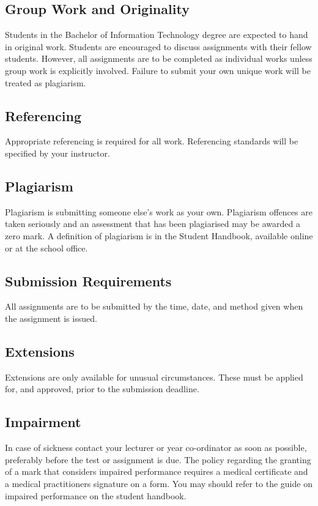 \documentclass{article}
\begin{document}
\subsection*{Group Work and Originality}
Students in the Bachelor of Information Technology degree are expected to hand in original work.  Students are encouraged to discuss
assignments with their fellow students.  However, all assignments are to be completed as individual works unless group work is explicitly involved.
Failure to submit your own unique work will be treated as plagiarism.

\subsection*{Referencing}
Appropriate referencing is required for all work.  Referencing standards will be specified by your instructor.

\subsection*{Plagiarism}
Plagiarism is submitting someone else's work as your own.  Plagiarism offences are taken seriously and an
assessment that has been plagiarised may be awarded a zero mark.  A definition of plagiarism is in the Student Handbook,
available online or at the school office.

\subsection*{Submission Requirements}
All assignments are to be submitted by the time, date, and method given when the assignment is issued.

\subsection*{Extensions}
Extensions are only available for unusual circumstances.  These must be applied for, and approved, prior to the submission deadline.

\subsection*{Impairment}
In case of sickness contact your lecturer or year co-ordinator as soon as possible, preferably before the test or
assignment is due.  The policy regarding the granting of a mark that considers impaired performance requires a medical
certificate and a medical practitioners signature on a form. You may should refer to the guide on impaired performance
on the student handbook.
\end{document}

